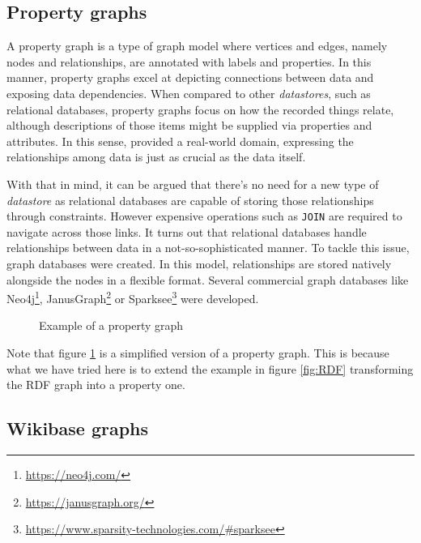 \begin{dumps}
    \inputminted{turtle}{code/listings/6-3_serialization.nt}
\end{dumps}

\subsection{Property graphs}

A property graph is a type of graph model where vertices and edges, namely nodes and relationships, are annotated with labels and properties. In this manner, property graphs excel at depicting connections between data and exposing data dependencies. When compared to other \textit{datastores}, such as relational databases, property graphs focus on how the recorded things relate, although descriptions of those items might be supplied via properties and attributes. In this sense, provided a real-world domain, expressing the relationships among data is just as crucial as the data itself.

With that in mind, it can be argued that there's no need for a new type of \textit{datastore} as relational databases are capable of storing those relationships through constraints. However expensive operations such as \texttt{JOIN} are required to navigate across those links. It turns out that relational databases handle relationships between data in a not-so-sophisticated manner. To tackle this issue, graph databases were created. In this model, relationships are stored natively alongside the nodes in a flexible format. Several commercial graph databases like Neo4j\footnote{\url{https://neo4j.com/}}, JanusGraph\footnote{\url{https://janusgraph.org/}} or Sparksee\footnote{\url{https://www.sparsity-technologies.com/\#sparksee}} were developed.

\begin{figure}[ht]
    \centering
    
    \caption{Example of a property graph}
    \label{fig:propertyGraph}
\end{figure}

Note that figure \ref{fig:propertyGraph} is a simplified version of a property graph. This is because what we have tried here is to extend the example in figure \ref{fig:RDF} transforming the RDF graph into a property one.

\label{section:wikibase_graphs}
\subsection{Wikibase graphs}

